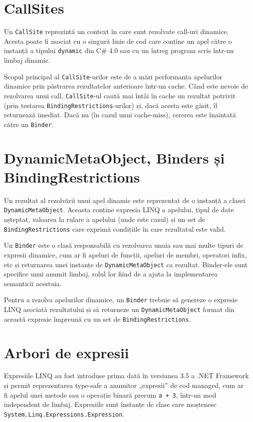 \documentclass[12pt,a4paper]{memoir}
\renewcommand{\c}{\texttt}
\begin{document}
\section{CallSites}

Un \c{CallSite} reprezintă un context în care sunt rezolvate call-uri dinamice. Acesta poate fi asociat cu o singură linie de cod care conține un apel către o instanță a tipului \c{dynamic} din C\# 4.0\cite{csharp_4_specs} sau cu un întreg program scris într-un limbaj dinamic. 

Scopul principal al \c{CallSite}-urilor este de a mări performanța apelurilor dinamice prin păstrarea rezultatelor anterioare într-un cache. Când este nevoie de rezolvarea unui call, \c{CallSite}-ul caută mai întâi în cache un rezultat potrivit (prin testarea \c{BindingRestrictions}-urilor) și, dacă acesta este găsit, îl returnează imediat. Dacă nu (în cazul unui cache-miss), cererea este înaintată către un \c{Binder}.

\section{DynamicMetaObject, Binders și BindingRestrictions}

Un rezultat al rezolvării unui apel dinamic este reprezentat de o instanță a clasei \c{DynamicMetaObject}\cite{dynamic_meta_object}. Aceasta conține expresia LINQ\cite{linq_expressions} a apelului, tipul de date așteptat, valoarea la rulare a apelului (unde este cazul) și un set de \c{BindingRestrictions} care exprimă condițiile în care rezultatul este valid.

Un \c{Binder} este o clasă responsabilă cu rezolvarea unuia sau mai multe tipuri de expresii dinamice, cum ar fi apeluri de funcții, apeluri de membri, operatori infix, etc și returnarea unei instanțe de \c{DynamicMetaObject} ca rezultat. Binder-ele sunt specifice unui anumit limbaj, rolul lor fiind de a ajuta la implementarea semanticii acestuia.

Pentru a rezolva apelurilor dinamice, un \c{Binder} trebuie să genereze o expresie LINQ asociată rezultatului și să returneze un \c{DynamicMetaObject} format din această expresie împreună cu un set de \c{BindingRestrictions}.

\section{Arbori de expresii}

Expresiile LINQ au fost introduse prima dată în versiunea 3.5 a .NET Framework\cite{expression_trees_35} și permit reprezentarea type-safe a anumitor „expresii” de cod managed, cum ar fi apelul unei metode sau o operație binară precum \c{a + 3}, într-un mod independent de limbaj. Expresiile sunt înstanțe de clase care moștenesc \c{System.Linq.Expressions.Expression}.
\end{document}
